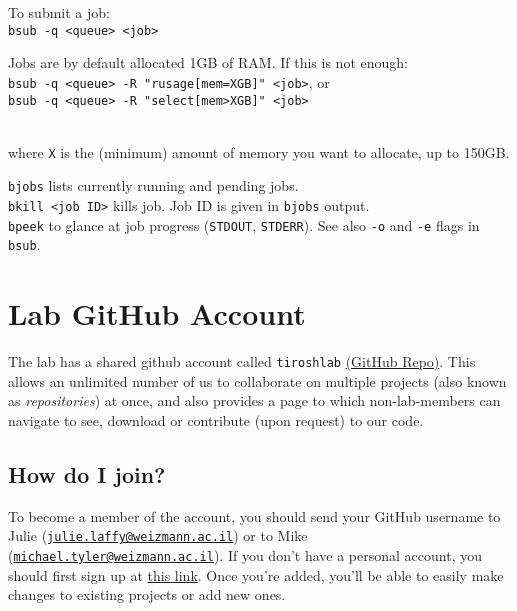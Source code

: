 \documentclass[
]{book}
\begin{document}
To submit a job:\\
\texttt{bsub\ -q\ \textless{}queue\textgreater{}\ \textless{}job\textgreater{}}

Jobs are by default allocated 1GB of RAM. If this is not enough:\\
\texttt{bsub\ -q\ \textless{}queue\textgreater{}\ -R\ "rusage{[}mem=XGB{]}"\ \textless{}job\textgreater{}}, or\\
\texttt{bsub\ -q\ \textless{}queue\textgreater{}\ -R\ "select{[}mem\textgreater{}XGB{]}"\ \textless{}job\textgreater{}}\strut \\
where \texttt{X} is the (minimum) amount of memory you want to allocate, up to 150GB.

\texttt{bjobs} lists currently running and pending jobs.\\
\texttt{bkill\ \textless{}job\ ID\textgreater{}} kills job. Job ID is given in \texttt{bjobs} output.\\
\texttt{bpeek} to glance at job progress (\texttt{STDOUT}, \texttt{STDERR}). See also \texttt{-o} and \texttt{-e} flags in \texttt{bsub}.

\hypertarget{labGitHub}{%
\chapter{Lab GitHub Account}\label{labGitHub}}

The lab has a shared github account called \texttt{tiroshlab} \href{https://github.com/tiroshlab}{(GitHub Repo)}. This allows an unlimited number of us to collaborate on multiple projects (also known as \emph{repositories}) at once, and also provides a page to which non-lab-members can navigate to see, download or contribute (upon request) to our code.

\hypertarget{how-do-i-join}{%
\section{How do I join?}\label{how-do-i-join}}

To become a member of the account, you should send your GitHub username to Julie (\href{mailto:julie.laffy@weizmann.ac.il}{\nolinkurl{julie.laffy@weizmann.ac.il}}) or to Mike (\href{mailto:michael.tyler@weizmann.ac.il}{\nolinkurl{michael.tyler@weizmann.ac.il}}). If you don't have a personal account, you should first sign up at \href{https://github.com/signup}{this link}. Once you're added, you'll be able to easily make changes to existing projects or add new ones.
\end{document}
